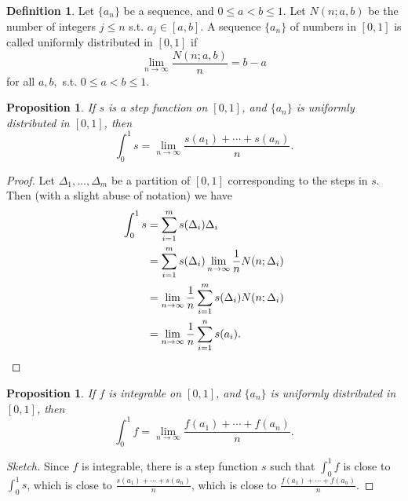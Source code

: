 \documentclass[12pt]{article}
\theoremstyle{plain}
\newtheorem{proposition}[theorem]{Proposition}
\theoremstyle{definition}
\newtheorem{definition}[theorem]{Definition}
\theoremstyle{remark}
\begin{document}
\begin{definition}
Let $\{a_n\}$ be a sequence, and $0 \leq a < b \leq 1$. Let $N(n; a, b)$ be the number of integers $j \leq n$ s.t. $a_j \in [a, b].$ A sequence $\{a_n\}$ of numbers in $[0, 1]$ is called uniformly distributed in $[0, 1]$ if $$\lim_{n \to \infty} \frac{N(n; a, b)}{n} = b - a$$ for all $a, b,$ s.t. $0 \leq a < b \leq 1.$
\end{definition}

\begin{proposition}
If $s$ is a step function on $[0, 1]$, and $\{a_n\}$ is uniformly distributed in $[0, 1]$, then $$\int_0^1 s = \lim_{n\to\infty} \frac{s(a_1) + \cdots + s(a_n)}{n}.$$
\end{proposition}

\begin{proof}
Let $\Delta_1, \ldots, \Delta_m$ be a partition of $[0, 1]$ corresponding to the steps in $s.$ Then (with a slight abuse of notation) we have 
\begin{align*}
\int_0^1 s &= \sum_{i=1}^m s(\Delta_i) \Delta_i \\
&= \sum_{i=1}^m s(\Delta_i) \lim_{n \to \infty} \frac{1}{n} N(n; \Delta_i) \\
&= \lim_{n \to \infty} \frac{1}{n} \sum_{i=1}^m s(\Delta_i) N(n; \Delta_i) \\
&= \lim_{n \to \infty} \frac{1}{n} \sum_{i=1}^n s(a_i).\qedhere
\end{align*}
\end{proof}

\begin{proposition}
If $f$ is integrable on $[0, 1]$, and $\{a_n\}$ is uniformly distributed in $[0, 1]$, then $$\int_0^1 f = \lim_{n\to\infty} \frac{f(a_1) + \cdots + f(a_n)}{n}.$$
\end{proposition}

\begin{proof}[Sketch]
Since $f$ is integrable, there is a step function $s$ such that $\int_0^1 f$ is close to $\int_0^1 s$, which is close to $\frac{s(a_1) + \cdots + s(a_n)}{n}$, which is close to $\frac{f(a_1) + \cdots + f(a_n)}{n}$.
\end{proof}
\end{document}
